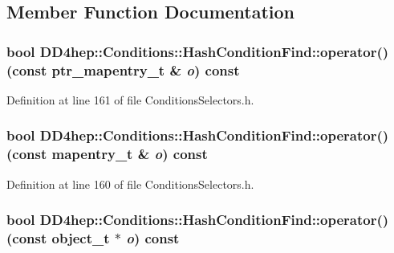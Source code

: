 \subsection{Member Function Documentation}
\hypertarget{class_d_d4hep_1_1_conditions_1_1_hash_condition_find_a851cfc091c17e57215db125166179892}{
\subsubsection[{operator()}]{\setlength{\rightskip}{0pt plus 5cm}bool DD4hep::Conditions::HashConditionFind::operator() (const {\bf ptr\_\-mapentry\_\-t} \& {\em o}) const}}
\label{class_d_d4hep_1_1_conditions_1_1_hash_condition_find_a851cfc091c17e57215db125166179892}


Definition at line 161 of file ConditionsSelectors.h.\hypertarget{class_d_d4hep_1_1_conditions_1_1_hash_condition_find_acd7eafeab132477b81033626723eec6e}{
\subsubsection[{operator()}]{\setlength{\rightskip}{0pt plus 5cm}bool DD4hep::Conditions::HashConditionFind::operator() (const {\bf mapentry\_\-t} \& {\em o}) const}}
\label{class_d_d4hep_1_1_conditions_1_1_hash_condition_find_acd7eafeab132477b81033626723eec6e}


Definition at line 160 of file ConditionsSelectors.h.\hypertarget{class_d_d4hep_1_1_conditions_1_1_hash_condition_find_a30dae6c145755de784670a202df06e5d}{
\subsubsection[{operator()}]{\setlength{\rightskip}{0pt plus 5cm}bool DD4hep::Conditions::HashConditionFind::operator() (const {\bf object\_\-t} $\ast$ {\em o}) const}}
\label{class_d_d4hep_1_1_conditions_1_1_hash_condition_find_a30dae6c145755de784670a202df06e5d}


